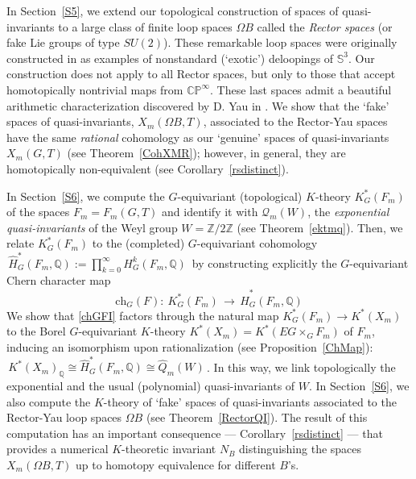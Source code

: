 \documentclass[11pt]{amsart}
\theoremstyle{definition}
\theoremstyle{remark}
\numberwithin{equation}{section}
\newcommand{\la}{\label}
\newcommand{\ch}{\mathrm{ch}}
\def\bS{\mathbb S}
\def\bP{\mathbb P}
\def\C{\mathbb C}
\def\cQ{\mathcal{Q}}
\def\Z{\mathbb{Z}}
\def\Q{\mathbb{Q}}
\begin{document}
In Section~\ref{S5}, we extend our topological construction of spaces of quasi-invariants to a large class of finite loop spaces $ \Omega B $ called the {\it Rector spaces} (or  fake Lie groups of type $SU(2)$). These remarkable loop spaces were originally constructed in \cite{Rec71}  as examples of nonstandard (`exotic') deloopings of $ \bS^3 $. Our construction does not apply to all Rector spaces, but only to those that accept homotopically nontrivial maps from $ \C \bP^\infty $. These last spaces admit a beautiful arithmetic characterization discovered by D. Yau in \cite{DY01}. We show that the `fake' spaces of quasi-invariants, $X_m(\Omega B,T) $, associated to the Rector-Yau spaces have the same {\it rational} cohomology as our `genuine' spaces of quasi-invariants $ X_m(G,T)$ (see Theorem~\ref{CohXMR}); however, in general, they are homotopically non-equivalent (see Corollary~\ref{rsdistinct}).

In Section~\ref{S6},  we compute the $G$-equivariant (topological) $K$-theory $ K^*_G(F_m)$ of the spaces $ F_m = F_m(G,T)$ and identify it with $ \cQ_m(W) $, the {\it exponential quasi-invariants} of the Weyl group $W = \Z/2\Z $ (see Theorem~\ref{ektmq}). Then, we relate $K^*_G(F_m) $ to the (completed) $G$-equivariant cohomology
$\,\widehat{H}^{\ast}_G(F_m, \Q) := \prod_{k=0}^\infty H^k_G(F_m, \Q)\,$ by constructing explicitly the $G$-equivariant Chern character map
%
\begin{equation}
\la{chGFI}
\ch_G(F):\ K^*_G(F_m) \,\to\, \widehat{H}^{\ast}_G(F_m, \Q)
\end{equation}
%
We show that  \eqref{chGFI} factors through the natural map $K^*_G(F_m) \to K^*(X_m) $ to the Borel $G$-equivariant $K$-theory $ K^*(X_m) = K^*(EG \times_G F_m) $ of $F_m$, inducing an isomorphism upon rationalization (see Proposition~\ref{ChMap}):
$\, K^*(X_m)_{\Q} \cong \widehat{H}^{\ast}_G(F_m, \Q) \cong \widehat{Q}_m(W)\,$. In this way, we link topologically the exponential and the usual (polynomial) quasi-invariants of $W$.
In Section~\ref{S6}, we also compute the $K$-theory of `fake' spaces
of quasi-invariants associated to the Rector-Yau loop spaces $ \Omega B $ (see Theorem~\ref{RectorQI}). The result of this computation has an important consequence --- Corollary~\ref{rsdistinct} --- that provides
a numerical $K$-theoretic invariant $ N_B $  distinguishing the spaces $ X_m(\Omega B,T) $  up to homotopy equivalence for different $B$'s.
\end{document}
